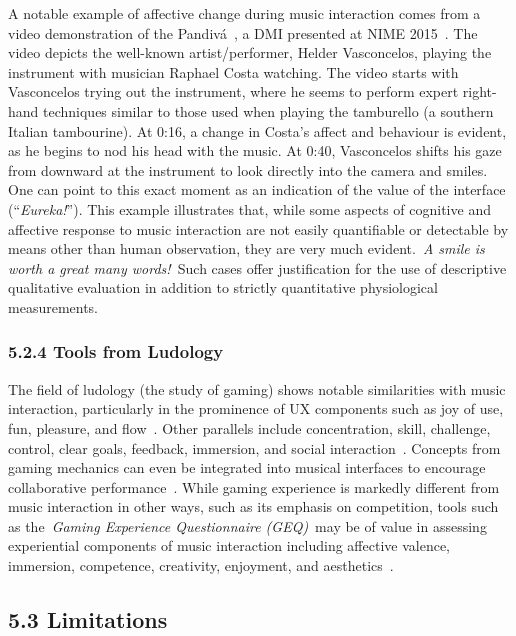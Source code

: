 \documentclass[sigconf]{nimeart}
\begin{document}
A notable example of affective change during music interaction comes from a video demonstration of the Pandivá~\cite{c29}, a DMI presented at NIME 2015~\cite{c30}. The video depicts the well-known artist/performer, Helder Vasconcelos, playing the instrument with musician Raphael Costa watching. The video starts with Vasconcelos trying out the instrument, where he seems to perform expert right-hand techniques similar to those used when playing the tamburello (a southern Italian tambourine). At 0:16, a change in Costa's affect and behaviour is evident, as he begins to nod his head with the music. At 0:40, Vasconcelos shifts his gaze from downward at the instrument to look directly into the camera and smiles. One can point to this exact moment as an indication of the value of the interface (``\emph{Eureka!}''). This example illustrates that, while some aspects of cognitive and affective response to music interaction are not easily quantifiable or detectable by means other than human observation, they are very much evident.~\emph{A smile is worth a great many words!~}Such cases offer justification for the use of descriptive qualitative evaluation in addition to strictly quantitative physiological measurements.

\subsubsection{5.2.4 Tools from Ludology}\label{tools-from-ludology}

The field of ludology (the study of gaming) shows notable similarities with music interaction, particularly in the prominence of UX components such as joy of use, fun, pleasure, and flow~\cite{c31,c32}. Other parallels include concentration, skill, challenge, control, clear goals, feedback, immersion, and social interaction~\cite{c13}. Concepts from gaming mechanics can even be integrated into musical interfaces to encourage collaborative performance~\cite{c32}. While gaming experience is markedly different from music interaction in other ways, such as its emphasis on competition, tools such as the~\emph{Gaming Experience Questionnaire (GEQ)}~may be of value in assessing experiential components of music interaction including affective valence, immersion, competence, creativity, enjoyment, and aesthetics~\cite{c31}.

\subsection{5.3 Limitations}\label{limitations}
\end{document}
